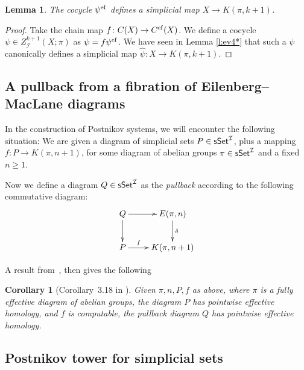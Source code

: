 \documentclass[12pt,a4wide]{article}
\theoremstyle{plain}
\newtheorem{corollary}[thm]{Corollary}
\newtheorem{lem}[thm]{Lemma}
\theoremstyle{definition}
\newcommand{\thedim}{{n}}
\newcommand{\thedimm}{{k}}
\renewcommand\:{\colon}
\newcommand{\dX}{X}
\newcommand{\dpi}{\pi}
\newcommand{\dP}{P}
\newcommand{\dQ}{Q}
\newcommand{\dK}{K}
\newcommand{\dE}{E}
\newcommand{\dC}{{C}}
\newcommand{\icat}{\mathcal I}
\newcommand\cobo{\delta}
\begin{document}
\begin{lem}\label{lem:efcococyleeml}
The cocycle $\psi^{\mathop\mathrm{ef}\nolimits}$ defines a simplicial map $\dX \to \dK(\dpi, \thedimm+1)$.
\end{lem}
\begin{proof}
Take the chain map $f \: \dC (\dX) \to \dC^{\ef} (\dX)$. We define
a cocycle $\psi\in Z^{\thedimm+1} _\icat  (\dX; \dpi)$ as
$\psi=f \psi^{\mathop\mathrm{ef}\nolimits}$. We have seen in Lemma \ref{l:ev4*} that such a $\psi$ canonically defines a simplicial map
$\widehat\psi\:\dX\to \dK(\dpi,\thedimm+1)$.
\end{proof}
\subsection{A pullback from a fibration of Eilenberg--MacLane diagrams}
\label{s:pullb}
In the construction of Postnikov systems, we will encounter the following situation: We are given
a diagram of simplicial sets $\dP\in \sSet^\icat$, plus a mapping
$f\:\dP\to \dK(\dpi,\thedim+1)$, for some diagram of abelian groups $\dpi \in \sSet^\icat$
and a fixed~$\thedim\ge 1$.

Now we define a diagram $\dQ\in \sSet^\icat$ as the \emph{pullback}
according to the following commutative diagram:
\[
\xymatrix{
\dQ \ar[r] \ar[d] & \dE(\dpi,\thedim) \ar[d]^{\cobo}\\
\dP\ar[r]^-{f} & \dK(\dpi,\thedim+1)
}
\]


A result from~\cite{polypost}, then gives the following
\begin{corollary}[Corollary~3.18 in \cite{polypost}]\label{c:pullback} Given $\dpi, \thedim, \dP, f$ as above, where $\dpi$ is a fully effective diagram of abelian groups, the diagram $\dP$ has pointwise effective homology, and $f$ is computable, the pullback diagram $\dQ$ has pointwise effective homology.
\end{corollary}



\subsection{Postnikov tower for simplicial sets}
\end{document}
